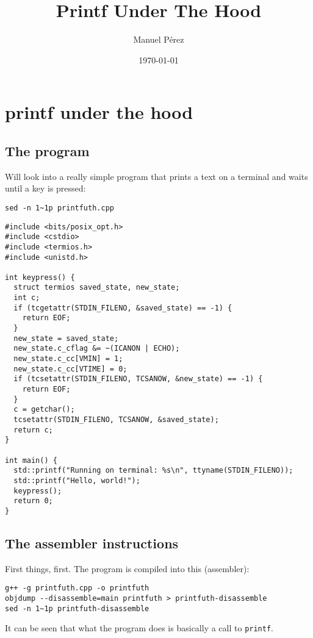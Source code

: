\documentclass[11pt]{article}
\author{Manuel Pérez}
\date{\today}
\title{Printf Under The Hood}
\begin{document}
\maketitle
\tableofcontents

\section{printf under the hood}
\label{sec:org06c327e}

\subsection{The program}
\label{sec:org73ef93c}

Will look into a really simple program that prints a text on a terminal and waits until a key is pressed:

\begin{verbatim}
sed -n 1~1p printfuth.cpp
\end{verbatim}

\begin{verbatim}
#include <bits/posix_opt.h>
#include <cstdio>
#include <termios.h>
#include <unistd.h>

int keypress() {
  struct termios saved_state, new_state;
  int c;
  if (tcgetattr(STDIN_FILENO, &saved_state) == -1) {
    return EOF;
  }
  new_state = saved_state;
  new_state.c_cflag &= ~(ICANON | ECHO);
  new_state.c_cc[VMIN] = 1;
  new_state.c_cc[VTIME] = 0;
  if (tcsetattr(STDIN_FILENO, TCSANOW, &new_state) == -1) {
    return EOF;
  }
  c = getchar();
  tcsetattr(STDIN_FILENO, TCSANOW, &saved_state);
  return c;
}

int main() {
  std::printf("Running on terminal: %s\n", ttyname(STDIN_FILENO));
  std::printf("Hello, world!");
  keypress();
  return 0;
}
\end{verbatim}
\subsection{The assembler instructions}
\label{sec:org11a8d25}

First things, first. The program is compiled into this (assembler):

\begin{verbatim}
g++ -g printfuth.cpp -o printfuth
objdump --disassemble=main printfuth > printfuth-disassemble
sed -n 1~1p printfuth-disassemble
\end{verbatim}

It can be seen that what the program does is basically a call to \texttt{printf}.
\end{document}
